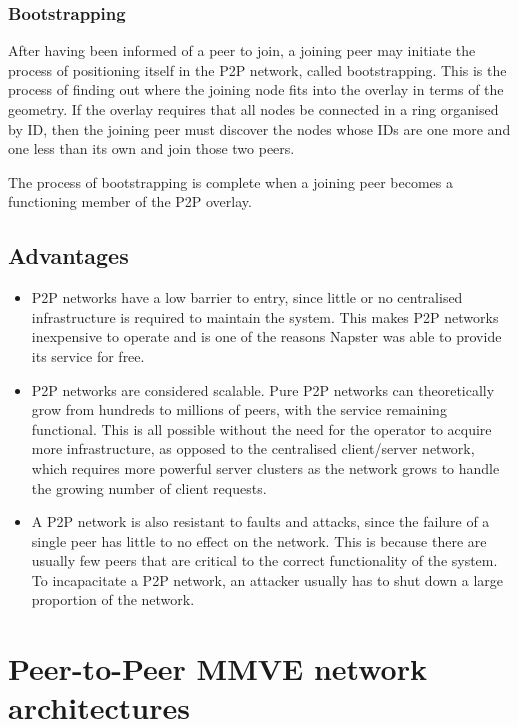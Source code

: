 \subsubsection{Bootstrapping}

After having been informed of a peer to join, a joining peer may initiate the process of positioning itself in the P2P network, called bootstrapping. This is the process of finding out where the joining node fits into the overlay in terms of the geometry. If the overlay requires that all nodes be connected in a ring organised by ID, then the joining peer must discover the nodes whose IDs are one more and one less than its own and join those two peers.

The process of bootstrapping is complete when a joining peer becomes a functioning member of the P2P overlay.


\subsection{Advantages}

\begin{itemize}
\item P2P networks have a low barrier to entry, since little or no centralised infrastructure is required to maintain the system. This makes P2P networks inexpensive to operate and is one of the reasons Napster was able to provide its service for free.

\item P2P networks are considered scalable. Pure P2P networks can theoretically grow from hundreds to millions of peers, with the service remaining functional. This is all possible without the need for the operator to acquire more infrastructure, as opposed to the centralised client/server network, which requires more powerful server clusters as the network grows to handle the growing number of client requests.

\item A P2P network is also resistant to faults and attacks, since the failure of a single peer has little to no effect on the network. This is because there are usually few peers that are critical to the correct functionality of the system. To incapacitate a P2P network, an attacker usually has to shut down a large proportion of the network.
\end{itemize}


\section{Peer-to-Peer MMVE network architectures}
\label{p2p_network_architectures}

